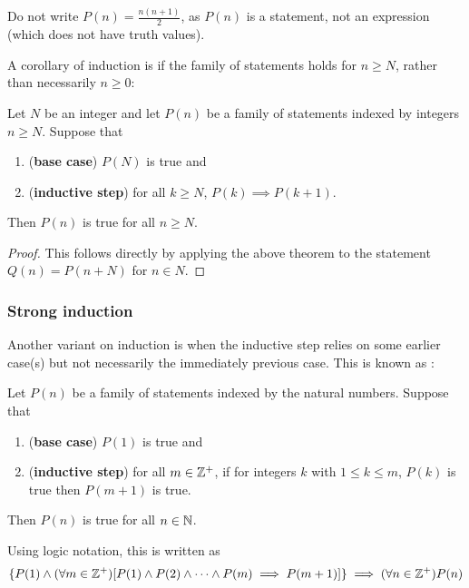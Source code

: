 \begin{remark}
Do not write $P(n)=\frac{n(n+1)}{2}$, as $P(n)$ is a statement, not an expression (which does not have truth values).
\end{remark}

A corollary of induction is if the family of statements holds for $n \ge N$, rather than necessarily $n \ge 0$:

\begin{corollary}
Let $N$ be an integer and let $P(n)$ be a family of statements indexed by integers $n \ge N$. Suppose that 
\begin{enumerate}[label=(\roman*)]
\item (\textbf{base case}) $P(N)$ is true and
\item (\textbf{inductive step}) for all $k \ge N$, $P(k) \implies P(k+1)$. 
\end{enumerate}
Then $P(n)$ is true for all $n \ge N$.
\end{corollary}

\begin{proof}
This follows directly by applying the above theorem to the statement $Q(n) = P(n+N)$ for $n \in N$.
\end{proof}

\subsubsection{Strong induction}
Another variant on induction is when the inductive step relies on some earlier case(s) but not necessarily the immediately previous case. This is known as :

\begin{theorem}
Let $P(n)$ be a family of statements indexed by the natural numbers. Suppose that
\begin{enumerate}[label=(\roman*)]
\item (\textbf{base case}) $P(1)$ is true and
\item (\textbf{inductive step}) for all $m \in \mathbb Z^+$, if for integers $k$ with $1 \le k \le m$, $P(k)$ is true then $P(m+1)$ is true.
\end{enumerate}
Then $P(n)$ is true for all $n \in \mathbb N$.
\end{theorem}

Using logic notation, this is written as
\[ \{P(1) \land (\forall m \in \mathbb Z^+) [P(1) \land P(2) \land \cdots \land P(m) \implies P(m+1)]\} \implies (\forall n \in \mathbb Z^+)P(n) \]

